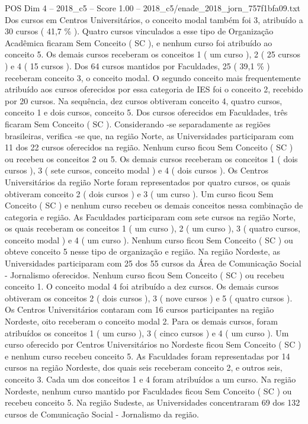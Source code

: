 \begin{textsample}{POS Dim 4 – 2018\_c5 – Score 1.00 – 2018\_c5/enade\_2018\_jorn\_757f1bfa09.txt}
Dos cursos em Centros Universitários, o conceito modal também foi 3, atribuído a 30 cursos ( 41,7 \% ).
Quatro cursos vinculados a esse tipo de Organização Acadêmica ficaram Sem Conceito ( SC ), e nenhum curso foi atribuído ao conceito 5.
Os demais cursos receberam os conceitos 1 ( um curso ), 2 ( 25 cursos ) e 4 ( 15 cursos ).
Dos 64 cursos mantidos por Faculdades, 25 ( 39,1 \% ) receberam conceito 3, o conceito modal.
O segundo conceito mais frequentemente atribuído aos cursos oferecidos por essa categoria de IES foi o conceito 2, recebido por 20 cursos.
Na sequência, dez cursos obtiveram conceito 4, quatro cursos, conceito 1 e dois cursos, conceito 5.
Dos cursos oferecidos em Faculdades, três ficaram Sem Conceito ( SC ).
Considerando -se separadamente as regiões brasileiras, verifica -se que, na região Norte, as Universidades participaram com 11 dos 22 cursos oferecidos na região.
Nenhum curso ficou Sem Conceito ( SC ) ou recebeu os conceitos 2 ou 5.
Os demais cursos receberam os conceitos 1 ( dois cursos ), 3 ( sete cursos, conceito modal ) e 4 ( dois cursos ).
Os Centros Universitários da região Norte foram representados por quatro cursos, os quais obtiveram conceito 2 ( dois cursos ) e 3 ( um curso ).
Um curso ficou Sem Conceito ( SC ) e nenhum curso recebeu os demais conceitos nessa combinação de categoria e região.
As Faculdades participaram com sete cursos na região Norte, os quais receberam os conceitos 1 ( um curso ), 2 ( um curso ), 3 ( quatro cursos, conceito modal ) e 4 ( um curso ).
Nenhum curso ficou Sem Conceito ( SC ) ou obteve conceito 5 nesse tipo de organização e região.
Na região Nordeste, as Universidades participaram com 25 dos 55 cursos da Área de Comunicação Social - Jornalismo oferecidos.
Nenhum curso ficou Sem Conceito ( SC ) ou recebeu conceito 1.
O conceito modal 4 foi atribuído a dez cursos.
Os demais cursos obtiveram os conceitos 2 ( dois cursos ), 3 ( nove cursos ) e 5 ( quatro cursos ).
Os Centros Universitários contaram com 16 cursos participantes na região Nordeste, oito receberam o conceito modal 2.
Para os demais cursos, foram atribuídos os conceitos 1 ( um curso ), 3 ( cinco cursos ) e 4 ( um curso ).
Um curso oferecido por Centros Universitários no Nordeste ficou Sem Conceito ( SC ) e nenhum curso recebeu conceito 5.
As Faculdades foram representadas por 14 cursos na região Nordeste, dos quais seis receberam conceito 2, e outros seis, conceito 3.
Cada um dos conceitos 1 e 4 foram atribuídos a um curso.
Na região Nordeste, nenhum curso mantido por Faculdades ficou Sem Conceito ( SC ) ou recebeu conceito 5.
Na região Sudeste, as Universidades concentraram 69 dos 132 cursos de Comunicação Social - Jornalismo da região.

\end{textsample}
